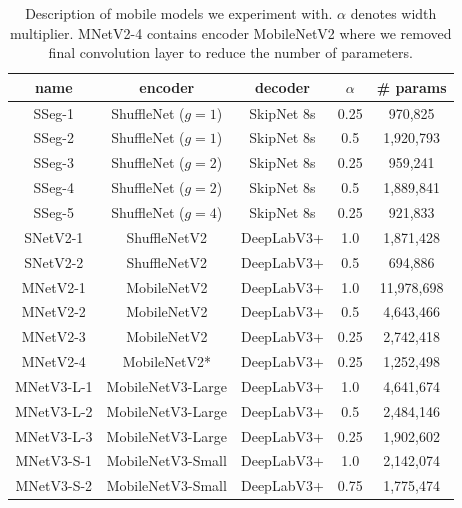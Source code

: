 \begin{table}[h]
	\centering
	\begin{tabular}{|c||c|c|c|c|}
	    \hline
		name & encoder & decoder & $\alpha$ & \# params \\
		\hline
        SSeg-1 & ShuffleNet ($g=1$) & SkipNet 8s & 0.25 & 970,825 \\
        SSeg-2 & ShuffleNet ($g=1$) & SkipNet 8s & 0.5 & 1,920,793 \\
        SSeg-3 & ShuffleNet ($g=2$) & SkipNet 8s & 0.25 & 959,241 \\
        SSeg-4 & ShuffleNet ($g=2$) & SkipNet 8s & 0.5 & 1,889,841 \\
        SSeg-5 & ShuffleNet ($g=4$) & SkipNet 8s & 0.25 & 921,833 \\
		\hline
		SNetV2-1 & ShuffleNetV2 & DeepLabV3+ & 1.0 & 1,871,428 \\
		SNetV2-2 & ShuffleNetV2 & DeepLabV3+ & 0.5 & 694,886 \\
		\hline
		MNetV2-1 & MobileNetV2 & DeepLabV3+ & 1.0 & 11,978,698 \\
		MNetV2-2 & MobileNetV2 & DeepLabV3+ & 0.5 & 4,643,466 \\
		MNetV2-3 & MobileNetV2 & DeepLabV3+ & 0.25 & 2,742,418 \\
		MNetV2-4 & MobileNetV2* & DeepLabV3+ & 0.25 & 1,252,498 \\
		\hline
		MNetV3-L-1 & MobileNetV3-Large & DeepLabV3+ & 1.0 & 4,641,674 \\
		MNetV3-L-2 & MobileNetV3-Large & DeepLabV3+ & 0.5 & 2,484,146 \\
		MNetV3-L-3 & MobileNetV3-Large & DeepLabV3+ & 0.25 & 1,902,602 \\
		\hline
		MNetV3-S-1 & MobileNetV3-Small & DeepLabV3+ & 1.0 & 2,142,074 \\
		MNetV3-S-2 & MobileNetV3-Small & DeepLabV3+ & 0.75 & 1,775,474 \\
		\hline
	\end{tabular}
	\caption[Description of mobile models]{Description of mobile models we experiment with.
	$\alpha$ denotes width multiplier. MNetV2-4 contains encoder MobileNetV2 where we removed
	final convolution layer to reduce the number of parameters.}
	\label{tab:mobilenets_desc}
\end{table}

